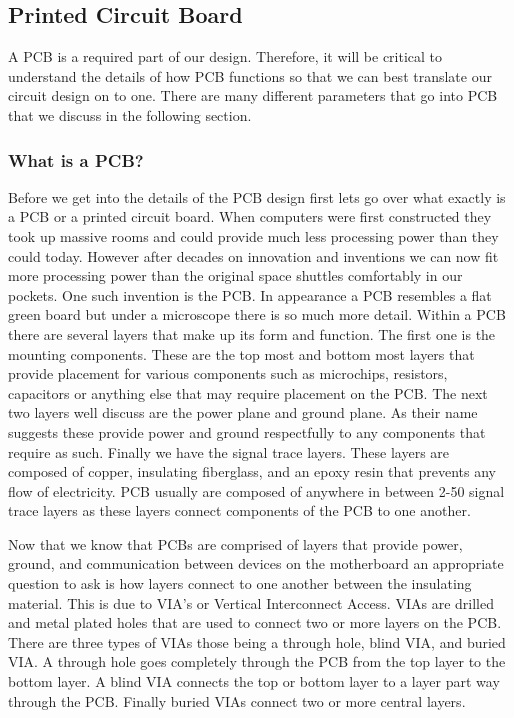 \subsection{Printed Circuit Board}
A PCB is a required part of our design. Therefore, it will be critical to understand the details of how PCB functions so that we can best translate our circuit design on to one. There are many different parameters that go into PCB that we discuss in the following section.

\subsubsection{What is a PCB?}
Before we get into the details of the PCB design first lets go over what exactly is a PCB or a printed circuit board. When computers were first constructed they took up massive rooms and could provide much less processing power than they could today. However after decades on innovation and inventions we can now fit more processing power than the original space shuttles comfortably in our pockets. One such invention is the PCB. In appearance a PCB resembles a flat green board but under a microscope there is so much more detail. Within a PCB there are several layers that make up its form and function. The first one is the mounting components. These are the top most and bottom most layers that provide placement for various components such as microchips, resistors, capacitors or anything else that may require placement on the PCB. The next two layers well discuss are the power plane and ground plane. As their name suggests these provide power and ground respectfully to any components that require as such. Finally we have the signal trace layers. These layers are composed of copper, insulating fiberglass, and an epoxy resin that prevents any flow of electricity. PCB usually are composed of anywhere in between 2-50 signal trace layers as these layers connect components of the PCB to one another. 

Now that we know that PCBs are comprised of layers that provide power, ground, and communication between devices on the motherboard an appropriate question to ask is how layers connect to one another between the insulating material. This is due to VIA's or Vertical Interconnect Access. VIAs are drilled and metal plated holes that are used to connect two or more layers on the PCB. There are three types of VIAs those being a through hole, blind VIA, and buried VIA. A through hole goes completely through the PCB from the top layer to the bottom layer. A blind VIA connects the top or bottom layer to a layer part way through the PCB. Finally buried VIAs connect two or more central layers. 

